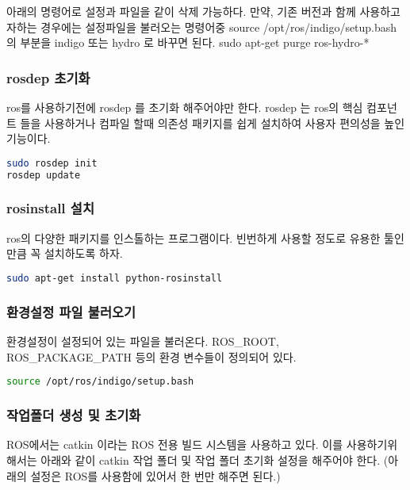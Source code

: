 \begin{exercise}
아래의 명령어로 설정과 파일을 같이 삭제 가능하다. 만약, 기존 버전과 함께 사용하고자하는 경우에는 설정파일을 불러오는 명령어중 source /opt/ros/indigo/setup.bash 의 부분을 indigo 또는 hydro 로 바꾸면 된다. sudo apt-get purge ros-hydro-*
\end{exercise}

\subsubsection{rosdep 초기화}
ros를 사용하기전에 rosdep 를 초기화 해주어야만 한다. rosdep 는 ros의 핵심 컴포넌트 들을 사용하거나 컴파일 할때 의존성 패키지를 쉽게 설치하여 사용자 편의성을 높인 기능이다.

\begin{lstlisting}[language=bash]
sudo rosdep init
rosdep update
\end{lstlisting}

\subsubsection{rosinstall 설치}
ros의 다양한 패키지를 인스톨하는 프로그램이다. 빈번하게 사용할 정도로 유용한 툴인만큼 꼭 설치하도록 하자. 

\begin{lstlisting}[language=bash]
sudo apt-get install python-rosinstall
\end{lstlisting}

\subsubsection{환경설정 파일 불러오기}
환경설정이 설정되어 있는 파일을 불러온다. ROS\_ROOT, ROS\_PACKAGE\_PATH 등의 환경 변수들이 정의되어 있다.

\begin{lstlisting}[language=bash]
source /opt/ros/indigo/setup.bash
\end{lstlisting}

\subsubsection{작업폴더 생성 및 초기화}
ROS에서는 catkin 이라는 ROS 전용 빌드 시스템을 사용하고 있다. 이를 사용하기위해서는 아래와 같이 catkin 작업 폴더 및 작업 폴더 초기화 설정을 해주어야 한다. (아래의 설정은 ROS를 사용함에 있어서 한 번만 해주면 된다.)

